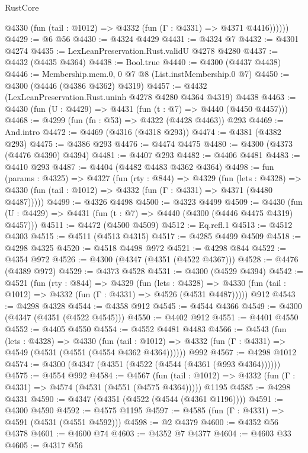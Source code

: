\begin{lexlean}{RustCore}
\begin{coremodule}
          @4330 (fun (tail : @1012) => @4332 (fun (Γ : @4331) => @4371 @4416))))))
@4429 := @6 @56
@4430 := @4324 @4429
@4431 := @4324 @7
@4432 := @4301 @4274
@4435 := LexLeanPreservation.Rust.validU @4278 @4280
@4437 := @4432 (@4435 @4364)
@4438 := Bool.true
@4440 := @4300 (@4437 @4438)
@4446 := Membership.mem.{0, 0} @7 @8 (List.instMembership.{0} @7)
@4450 := @4300 (@4446 (@4386 @4362) @4319)
@4457 := @4432 (LexLeanPreservation.Rust.uninh @4278 @4280 @4364 @4319) @4438
@4463 := @4430 (fun (U : @4429) => @4431 (fun (t : @7) => @4440 (@4450 @4457)))
@4468 := @4299 (fun (fn : @53) => @4322 (@4428 @4463)) @293
@4469 := And.intro
@4472 := @4469 (@4316 (@4318 @293))
@4474 := @4381 (@4382 @293)
@4475 := @4386 @293
@4476 := @4474 @4475
@4480 := @4300 (@4373 (@4476 @4390) @4394)
@4481 := @4407 @293
@4482 := @4406 @4481
@4483 := @4410 @293
@4487 := @4404 (@4482 @4483 @4362 @4364)
@4498 := fun (params : @4325) =>
  @4327
    (fun (rty : @844) =>
    @4329
      (fun (lets : @4328) =>
      @4330 (fun (tail : @1012) => @4332 (fun (Γ : @4331) => @4371 (@4480 @4487)))))
@4499 := @4326 @4498
@4500 := @4323 @4499
@4509 := @4430 (fun (U : @4429) => @4431 (fun (t : @7) => @4440 (@4300 (@4446 @4475 @4319) @4457)))
@4511 := @4472 (@4500 @4509)
@4512 := Eq.refl.{1}
@4513 := @4512 @4303
@4515 := @4511 (@4513 @4315)
@4517 := @4285 @4499 @4509
@4518 := @4298 @4325
@4520 := @4518 @4498 @972
@4521 := @4298 @844
@4522 := @4354 @972
@4526 := @4300 (@4347 (@4351 (@4522 @4367)))
@4528 := @4476 (@4389 @972)
@4529 := @4373 @4528
@4531 := @4300 (@4529 @4394)
@4542 := @4521
    (fun (rty : @844) =>
    @4329
      (fun (lets : @4328) =>
      @4330 (fun (tail : @1012) => @4332 (fun (Γ : @4331) => @4526 (@4531 @4487)))))
    @912
@4543 := @4298 @4328
@4544 := @4358 @912
@4545 := @4544 @4366
@4549 := @4300 (@4347 (@4351 (@4522 @4545)))
@4550 := @4402 @912
@4551 := @4401 @4550
@4552 := @4405 @4550
@4554 := @4552 @4481 @4483
@4566 := @4543
    (fun (lets : @4328) =>
    @4330
      (fun (tail : @1012) => @4332 (fun (Γ : @4331) => @4549 (@4531 (@4551 (@4554 @4362 @4364))))))
    @992
@4567 := @4298 @1012
@4574 := @4300 (@4347 (@4351 (@4522 (@4544 (@4361 (@993 @4364))))))
@4575 := @4554 @992
@4584 := @4567
    (fun (tail : @1012) => @4332 (fun (Γ : @4331) => @4574 (@4531 (@4551 (@4575 @4364)))))
    @1195
@4585 := @4298 @4331
@4590 := @4347 (@4351 (@4522 (@4544 (@4361 @1196))))
@4591 := @4300 @4590
@4592 := @4575 @1195
@4597 := @4585 (fun (Γ : @4331) => @4591 (@4531 (@4551 @4592)))
@4598 := @2 @4379
@4600 := @4352 @56 @4378
@4601 := @4600 @74
@4603 := @4352 @7 @4377
@4604 := @4603 @33
@4605 := @4317 @56

\end{coremodule}
\end{lexlean}
